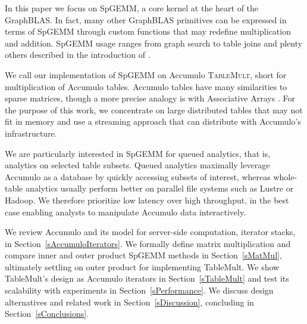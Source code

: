
In this paper we focus on SpGEMM, a core kernel at the heart of the GraphBLAS.
In fact, many other GraphBLAS primitives can be expressed in terms of
SpGEMM through custom functions that may redefine multiplication and addition. 
SpGEMM usage ranges from graph search \cite{kepner2011graph} to table joins \cite{cohen2009mad} 
and plenty others described in the introduction of \cite{bulucc2010highly}.

We call our implementation of SpGEMM on Accumulo \textsc{TableMult}, short for multiplication of Accumulo tables.
Accumulo tables have many similarities to sparse matrices, though a more precise analogy is with Associative Arrays 
\cite{kepner2014gabb}. For the purpose of this work, we concentrate on
large distributed tables that may not fit in memory and use a streaming
approach that can distribute with Accumulo's infrastructure.

We are particularly interested in SpGEMM for queued analytics, that is, analytics on selected table subsets.  
Queued analytics maximally leverage Accumulo as a database 
by quickly accessing subsets of interest, 
whereas whole-table analytics usually perform better on parallel file systems such as Lustre or Hadoop.
We therefore prioritize low latency over high throughput, %
in the best case enabling analysts to manipulate Accumulo data interactively.


We review Accumulo and its model for server-side computation, iterator stacks, 
in Section~\ref{sAccumuloIterators}.
We formally define matrix multiplication and compare inner and outer product SpGEMM methods
in Section~\ref{sMatMul}, ultimately settling on outer product for implementing TableMult.
We show TableMult's design as Accumulo iterators in Section~\ref{sTableMult}
and test its scalability with experiments in Section~\ref{sPerformance}.
We discuss design alternatives and related work in Section~\ref{sDiscussion}, 
concluding in Section~\ref{sConclusions}.


